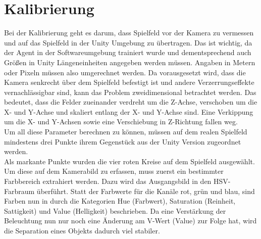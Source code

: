 \section{Kalibrierung}
\label{sect:kalib}
Bei der Kalibrierung geht es darum, dass Spielfeld vor der Kamera zu vermessen und auf das Spielfeld in der Unity Umgebung zu übertragen. Das ist wichtig, da der Agent in der Softwareumgebung trainiert wurde und dementsprechend auch Größen in Unity Längeneinheiten angegeben werden müssen. Angaben in Metern oder Pixeln müssen also umgerechnet werden. Da vorausgesetzt wird, dass die Kamera senkrecht über dem Spielfeld befestigt ist und andere Verzerrungseffekte vernachlässigbar sind, kann das Problem zweidimensional betrachtet werden. Das bedeutet, dass die Felder zueinander verdreht um die Z-Achse, verschoben um die X- und Y-Achse und skaliert entlang der X- und Y-Achse sind. Eine Verkippung um die X- und Y-Achsen sowie eine Verschiebung in Z-Richtung fallen weg. \\
Um all diese Parameter berechnen zu können, müssen auf dem realen Spielfeld mindestens drei Punkte ihrem Gegenstück aus der Unity Version zugeordnet werden.\\
Als markante Punkte wurden die vier roten Kreise auf dem Spielfeld ausgewählt. Um diese auf dem Kamerabild zu erfassen, muss zuerst ein bestimmter Farbbereich extrahiert werden. Dazu wird das Ausgangsbild in den HSV-Farbraum überführt. Statt der Farbwerte für die Kanäle rot, grün und blau, sind Farben nun in durch die Kategorien Hue (Farbwert), Saturation (Reinheit, Sattigkeit) und Value (Helligkeit) beschrieben. Da eine Verstärkung der Beleuchtung nun nur noch eine Änderung am V-Wert (Value) zur Folge hat, wird die Separation eines Objekts dadurch viel stabiler.\\

